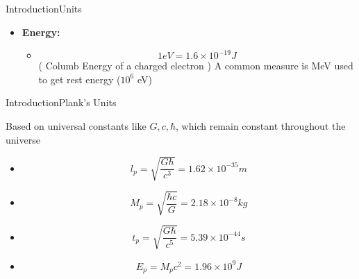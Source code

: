 \begin{frame}{Introduction}{Units}

    \begin{itemize}[<+->]
\item \textbf{Energy:} \begin{itemize}

	\small
\item
	\centering
	$$ 1 eV = 1.6 \times 10^{-19} J $$
	( Columb Energy of a charged electron ) A common measure
	is MeV used to get rest energy ($10^6$ eV)

\end{itemize}
    \end{itemize}
\end{frame}



\begin{frame}{Introduction}{Plank's Units}

	Based on universal constants like $G, c, \hbar$, which remain
	constant throughout the universe

	\begin{itemize}[<+->]
		\item $$ l_p = \sqrt{\frac{G\hbar}{c^3}} = 1.62 \times 10^{-35}
			m$$
		\item $$ M_p = \sqrt{\frac{\hbar c}{G}} = 2.18 \times 10^{-8} kg $$
		\item $$ t_p = \sqrt{\frac{G\hbar }{c^5}} = 5.39 \times 10^{-44}
			s$$
		\item $$ E_p = M_p c^2 = 1.96 \times 10^{9} J $$
	\end{itemize}
\end{frame}
